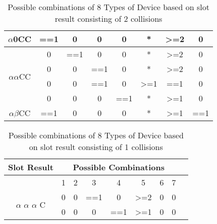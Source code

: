 \documentclass[fleqn]{article}
\begin{document}
\begin{table}[]
\begin{tabular}{|c|c|c|c|c|c|c|c|}
$\alpha$0CC                         & ==1              & 0                & 0   & 0   & *                & \textgreater{}=2 & 0   \\ \hline
\multirow{4}{*}{$\alpha$$\alpha$CC} & 0                & ==1              & 0   & 0   & *                & \textgreater{}=2 & 0   \\ \cline{2-8} 
                                    & 0                & 0                & ==1 & 0   & *                & \textgreater{}=2 & 0   \\ \cline{2-8} 
                                    & 0                & 0                & ==1 & 0   & \textgreater{}=1 & ==1              & 0   \\ \cline{2-8} 
                                    & 0                & 0                & 0   & ==1 & *                & \textgreater{}=1 & 0   \\ \hline
$\alpha$$\beta$CC                   & ==1              & 0                & 0   & 0   & *                & \textgreater{}=1 & ==1 \\ \hline

\end{tabular}
\caption{Possible combinations of 8 Types of Device based on slot result consisting of 2 collisions}
\label{Tab8_2C}
\end{table}

\begin{table}[h]
\centering
\label{my-label}
\begin{tabular}{|c|c|c|c|c|c|c|c|c|}

\hline
Slot Result                                   & \multicolumn{7}{c|}{Possible Combinations}   \\ \hline
                                              & 1 & 2 & 3   & 4   & 5                & 6 & 7 \\ \hline
\multirow{2}{*}{$\alpha$ $\alpha$ $\alpha$ C} & 0 & 0 & ==1 & 0   & \textgreater{}=2 & 0 & 0 \\ \cline{2-8} 
                                              & 0 & 0 & 0   & ==1 & \textgreater{}=1 & 0 & 0 \\ \hline
\end{tabular}
\caption{Possible combinations of 8 Types of Device based on slot result consisting of 1 collisions}
\label{Tab8_2C}
\end{table}
\end{document}

